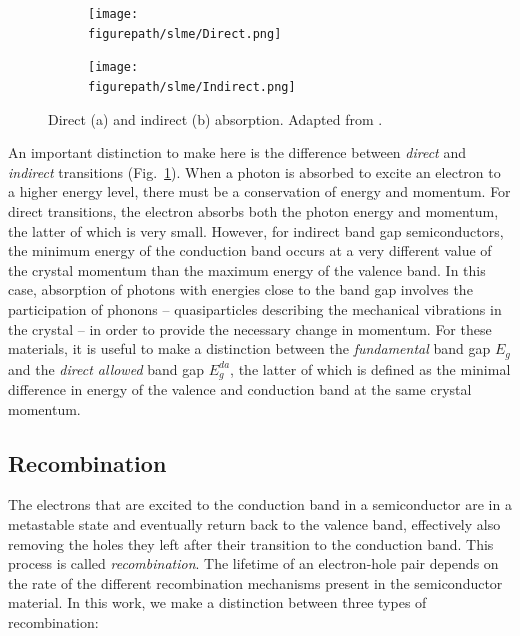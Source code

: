 \begin{refsection}
\begin{figure}[ht]  
\centering 
\begin{subfigure}{0.50\textwidth} 
\centering 
\texttt{[image: \\figurepath/slme/Direct.png]} 
\caption{} 
\end{subfigure}%
\begin{subfigure}{0.50\textwidth} 
\centering 
\texttt{[image: \\figurepath/slme/Indirect.png]} 
\caption{} 
\end{subfigure} 
\caption{\label{slme:fig-abstypes}Direct (a) and indirect (b) absorption. 
Adapted from \cite{Green1981}.} 
\end{figure} 
 
An important distinction to make here is the difference 
between \textit{direct} and \textit{indirect} transitions 
(Fig.~\ref{slme:fig-abstypes}). When a photon is absorbed to excite an 
electron to a higher energy level, there must be a conservation of energy and 
momentum. For direct transitions, the electron absorbs both the photon energy 
and momentum, the latter of which is very small. However, for indirect band 
gap semiconductors, the minimum energy of the conduction band occurs at a very 
different value of the crystal momentum than the maximum energy of the valence 
band. In this case, absorption of photons with energies close to the band gap 
involves the participation of phonons -- quasiparticles describing the 
mechanical vibrations in the crystal -- in order to provide the necessary change 
in momentum. For these materials, it is useful to make a distinction between 
the \textit{fundamental} band gap $E_g$ and the \textit{direct allowed} band 
gap $E_g^{da}$, the latter of which is defined as the minimal difference in 
energy of the valence and conduction band at the same crystal momentum. 
 
\subsection{Recombination}\label{slme:sec-recombination} 
 
The electrons that are excited to the conduction band in a semiconductor are 
in a metastable state and eventually return back to the valence band, 
effectively also removing the holes they left after their transition to the 
conduction band. This process is called \textit{recombination}. The lifetime 
of an electron-hole pair depends on the rate of the different recombination 
mechanisms present in the semiconductor material. In this work, we make a 
distinction between three types of recombination: 
 

\end{refsection}
